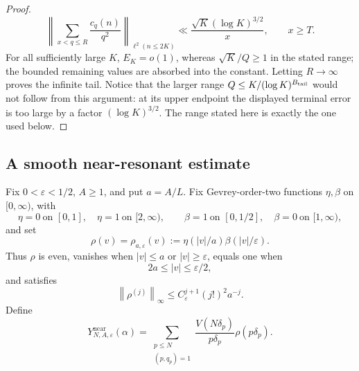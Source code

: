 \documentclass[11pt]{article}
\numberwithin{equation}{section}
\theoremstyle{definition}
\newcommand{\1}{\mathbf 1}
\newcommand{\norm}[1]{\left\lVert#1\right\rVert}
\begin{document}
\begin{proof}
\begin{equation}\label{eq:ram-tail-terminal}
 \left\|\sum_{x<q\le R}\frac{c_q(n)}{q^2}\right\|_{\ell^2(n\le2K)}
 \ll\frac{\sqrt K(\log K)^{3/2}}{x},
 \qquad x\ge T.
\end{equation}
For all sufficiently large
\(K\), \(E_K=o(1)\), whereas
\(\sqrt K/Q\ge1\) in the stated range; the bounded remaining values are
absorbed into the constant.  Letting \(R\to\infty\) proves the infinite
tail.  Notice that the larger range
\(Q\le K/(\log K)^{B_{\rm tail}}\) would not follow from this argument: at its
upper endpoint the displayed terminal error is too large by a factor
\((\log K)^{3/2}\).  The range stated here is exactly the one used below.
\end{proof}

\subsection{A smooth near-resonant estimate}

Fix \(0<\varepsilon<1/2\), \(A\ge1\), and put \(a=A/L\).
Fix Gevrey-order-two functions \(\eta,\beta\) on \([0,\infty)\), with
\[
 \eta=0\ \text{on }[0,1],\quad \eta=1\ \text{on }[2,\infty),
 \qquad
 \beta=1\ \text{on }[0,1/2],\quad \beta=0\ \text{on }[1,\infty),
\]
and set
\[
 \rho(v)=\rho_{a,\varepsilon}(v)
 :=\eta(|v|/a)\beta(|v|/\varepsilon).
\]
Thus \(\rho\) is even, vanishes when
\(|v|\le a\) or \(|v|\ge\varepsilon\), equals one when
\[
 2a\le|v|\le\varepsilon/2,
\]
and satisfies
\begin{equation}\label{eq:gevrey}
 \norm{\rho^{(j)}}_\infty
 \le C_\varepsilon^{j+1}(j!)^2a^{-j}.
\end{equation}
Define
\begin{equation}\label{eq:Ynear}
 Y^{\mathrm{near}}_{N,A,\varepsilon}(\alpha)=
 \sum_{\substack{p\le N\\(p,q_p)=1}}
 \frac{V(N\delta_p)}{p\delta_p}\rho(p\delta_p).
\end{equation}
\end{document}
